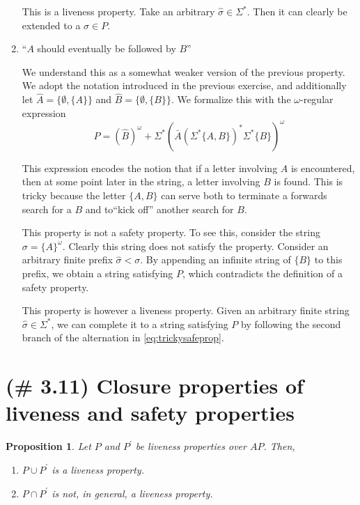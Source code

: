 \documentclass[letterpaper,11pt]{article}
\newtheorem{prop}{Proposition}
\newcommand{\union}{\cup}
\newcommand{\intersn}{\cap}
\begin{document}
\begin{enumerate}
        This is a liveness property.
        Take an arbitrary $\hat \sigma \in \Sigma^*$.
        Then it can clearly be extended to a $\sigma \in P$.

    \item ``$A$ should eventually be followed by $B$''

        We understand this as a somewhat weaker version of the previous
        property. We adopt the notation introduced in the previous exercise,
        and additionally
        let $\hat A = \{ \emptyset, \{A\} \}$
        and $\hat B = \{ \emptyset, \{B\} \}$.
        We formalize this with the
        $\omega$-regular expression
        \begin{equation}
            \label{eq:trickysafeprop}
            P
            = (\hat B)^\omega
            + \Sigma^* (\bar A (\Sigma^* \{A, B\})^* \Sigma^* \{B\})^\omega
        \end{equation}

        This expression encodes the notion that if a letter involving $A$ is
        encountered, then at some point later in the string, a letter involving
        $B$ is found. This is tricky because the letter $\{A, B\}$ can serve
        both to terminate a forwards search for a $B$ and to``kick off''
        another search for $B$.

        This property is not a safety property. To see this, consider the
        string $\sigma = \{A\}^\omega$. Clearly this string does not satisfy
        the property. Consider an arbitrary finite prefix
        $\hat \sigma < \sigma$. By appending an infinite string of $\{B\}$ to
        this prefix, we obtain a string satisfying $P$, which contradicts the
        definition of a safety property.

        This property is however a liveness property. Given an arbitrary finite
        string $\hat \sigma \in \Sigma^*$, we can complete it to a string
        satisfying $P$ by following the second branch of the alternation in
        \eqref{eq:trickysafeprop}.
\end{enumerate}

\section{(\# 3.11) Closure properties of liveness and safety properties}

\begin{prop}
    Let $P$ and $P^\prime$ be liveness properties over $AP$. Then,
    \begin{enumerate}
        \item $P \union P^\prime$ is a liveness property.
        \item $P \intersn P^\prime$ is not, in general, a liveness property.
    \end{enumerate}
\end{prop}
\end{document}
